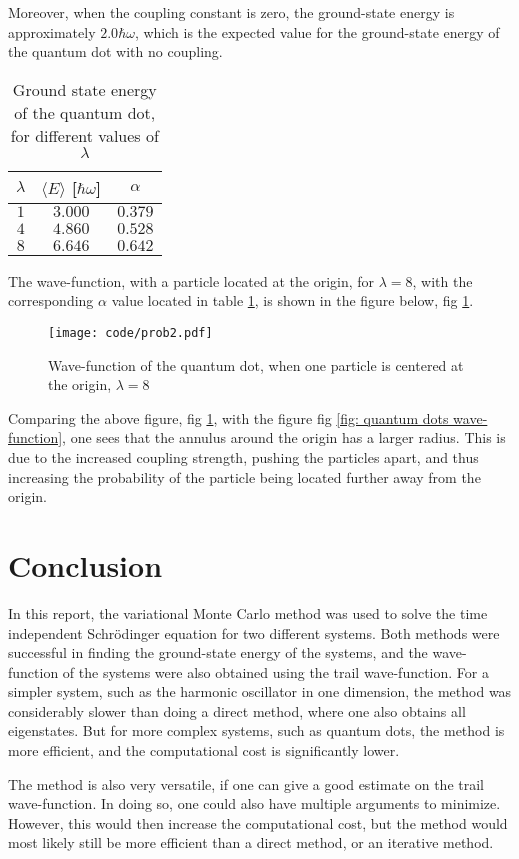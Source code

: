 \documentclass[a4paper]{article}
\newcommand{\w}{\omega}
\newcommand{\newparagraph}{\vspace{.5cm}\noindent}
\newcommand{\average}[1]{\langle #1 \rangle}
\begin{document}
Moreover, when the coupling constant is zero, the ground-state energy is approximately $2.0\hbar\w$, which is the expected value for the ground-state energy of the quantum dot with no coupling.
\begin{table}
    \centering
    \caption{Ground state energy of the quantum dot, for different values of $\lambda$}
    \begin{tabular}{|c|c|c|}\hline
        $\lambda$ & $\average{E}$ [$\hbar\w$]& $\alpha$ \\\hline
        $1$ & $3.000$ & $0.379$\\
        $4$ & $4.860$ & $0.528$\\
        $8$ & $6.646$ & $0.642$\\\hline
    \end{tabular}
    \label{tab: quantum dots energy}
\end{table}
The wave-function, with a particle located at the origin, for $\lambda = 8$, with the corresponding $\alpha$ value located in table \ref{tab: quantum dots energy}, is shown in the figure below, fig \ref{fig: quantum dots wave-function lambda 8}.
\begin{figure}[H]
    \centering
    \texttt{[image: code/prob2.pdf]}
    \caption{Wave-function of the quantum dot, when one particle is centered at the origin, $\lambda = 8$}
    \label{fig: quantum dots wave-function lambda 8}
\end{figure}\noindent
Comparing the above figure, fig \ref{fig: quantum dots wave-function lambda 8}, with the figure fig \ref{fig: quantum dots wave-function}, one sees that the annulus around the origin has a larger radius.
This is due to the increased coupling strength, pushing the particles apart, and thus increasing the probability of the particle being located further away from the origin.

\section{Conclusion}
In this report, the variational Monte Carlo method was used to solve the time independent Schrödinger equation for two different systems.
Both methods were successful in finding the ground-state energy of the systems, and the wave-function of the systems were also obtained using the trail wave-function.
For a simpler system, such as the harmonic oscillator in one dimension, the method was considerably slower than doing a direct method, where one also obtains all eigenstates.
But for more complex systems, such as quantum dots, the method is more efficient, and the computational cost is significantly lower.

\newparagraph
The method is also very versatile, if one can give a good estimate on the trail wave-function. In doing so, one could also have multiple arguments to minimize.
However, this would then increase the computational cost, but the method would most likely still be more efficient than a direct method, or an iterative method.
\end{document}
